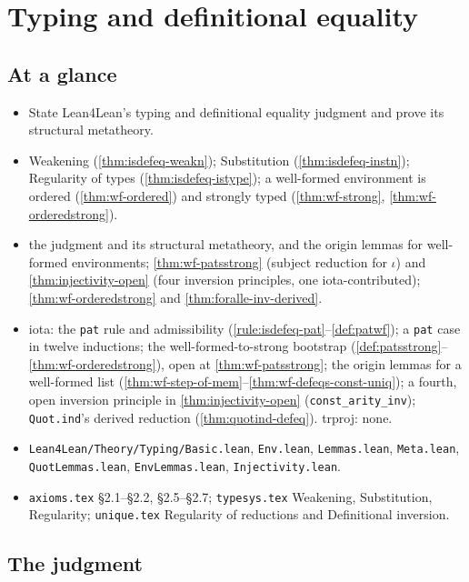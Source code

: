 \chapter{Typing and definitional equality}
\label{chap:typing}

\section*{At a glance}
\begin{itemize}
\item {} State Lean4Lean's typing and definitional equality judgment and prove its
  structural metatheory.
\item {} Weakening (\ref{thm:isdefeq-weakn}); Substitution
  (\ref{thm:isdefeq-instn}); Regularity of types (\ref{thm:isdefeq-istype}); a well-formed
  environment is ordered (\ref{thm:wf-ordered}) and strongly typed (\ref{thm:wf-strong},
  \ref{thm:wf-orderedstrong}).
\item {} \stProved{} the judgment and its structural metatheory, and the origin
  lemmas for well-formed environments; \stSorry{} \ref{thm:wf-patsstrong} (subject reduction
  for $\iota$) and \ref{thm:injectivity-open} (four inversion principles, one iota-contributed);
  \stTainted{} \ref{thm:wf-orderedstrong} and \ref{thm:foralle-inv-derived}.
\item {} iota: the \texttt{pat} rule and admissibility
  (\ref{rule:isdefeq-pat}--\ref{def:patwf}); a \texttt{pat} case in twelve inductions; the
  well-formed-to-strong bootstrap (\ref{def:patsstrong}--\ref{thm:wf-orderedstrong}), open at
  \ref{thm:wf-patsstrong}; the origin lemmas for a well-formed list
  (\ref{thm:wf-step-of-mem}--\ref{thm:wf-defeqs-const-uniq}); a fourth, open inversion
  principle in \ref{thm:injectivity-open} (\texttt{const\_arity\_inv}); \texttt{Quot.ind}'s
  derived reduction (\ref{thm:quotind-defeq}). trproj: none.
\item {} \texttt{Lean4Lean/Theory/Typing/Basic.lean}, \texttt{Env.lean},
  \texttt{Lemmas.lean}, \texttt{Meta.lean}, \texttt{QuotLemmas.lean}, \texttt{EnvLemmas.lean},
  \texttt{Injectivity.lean}.
\item {} \texttt{axioms.tex} \S2.1--\S2.2, \S2.5--\S2.7; \texttt{typesys.tex}
  Weakening, Substitution, Regularity; \texttt{unique.tex} Regularity of reductions and
  Definitional inversion.
\end{itemize}

\section{The judgment}
\label{sec:typing-basic}


